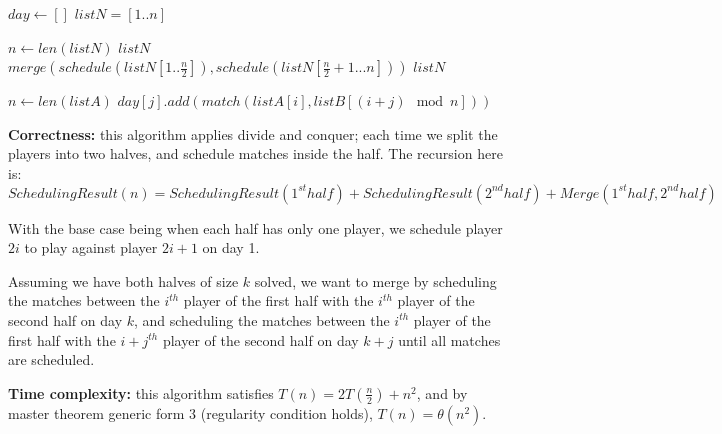 \documentclass{article}
\begin{document}
\begin{description}
\begin{algorithm}[H]
\begin{algorithmic}[1]
    \State $day \gets []$
    \State $listN=[1..n]$

      \State $n \gets len(listN)$
        \State \Return $listN$
      \EndIf
      \State $merge(schedule(listN[1..\frac{n}{2}]), schedule(listN[\frac{n}{2}+1...n]))$
      \State \Return $listN$
    \EndFunction

      \State $n \gets len(listA)$
          \State $day[j].add(match(listA[i], listB[(i+j) \mod n]))$
        \EndFor
      \EndFor
    \EndFunction

    \end{algorithmic}
  \end{algorithm}

  \textbf{Correctness:} this algorithm applies divide and conquer; each time we split the players into two halves, and schedule matches inside the half. The recursion here is: 
  $$SchedulingResult(n) = SchedulingResult(1^{st} half) + SchedulingResult(2^{nd} half) + Merge(1^{st} half, 2^{nd} half)$$ 

  With the base case being when each half has only one player, we schedule player $2i$ to play against player $2i+1$ on day 1. 

  Assuming we have both halves of size $k$ solved, we want to merge by scheduling the matches between the $i^{th}$ player of the first half with the $i^{th}$ player of the second half on day $k$, and scheduling the matches between the $i^{th}$ player of the first half with the $i+j^{th}$ player of the second half on day $k+j$ until all matches are scheduled.

  \textbf{Time complexity:} this algorithm satisfies $T(n) = 2T(\frac{n}{2}) + n^2$, and by master theorem generic form 3 (regularity condition holds), $T(n) = \theta(n^2)$.

\end{description}
\end{document}
